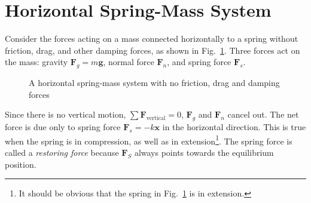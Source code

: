 \section{Horizontal Spring-Mass System}
Consider the forces acting on a mass connected horizontally to a spring without
friction, drag, and other damping forces, as shown in
Fig.~\ref{fig:horizontal-spring-mass1}. Three forces act on the mass: gravity
$\bm F_g=m\bm g$, normal force $\bm F_n$, and spring force $\bm F_s$.
\begin{figure}[hbt]
  \centering
  \caption{A horizontal spring-mass system with no friction, drag and damping
    forces}
  \label{fig:horizontal-spring-mass1}
\end{figure}
Since there is no vertical motion, $\sum\bm F_\text{vertical}=0$, $\bm F_g$ and
$\bm F_n$ cancel out. The net force is due only to spring force
$\bm F_s=-k\bm x$ in the horizontal direction. This is true when the spring is
in compression, as well as in extension\footnote{It should be obvious that the
spring in Fig.~\ref{fig:horizontal-spring-mass1} is in extension.}. The spring
force is called a \emph{restoring force} because $\bm F_S$ always points
towards the equilibrium position.

